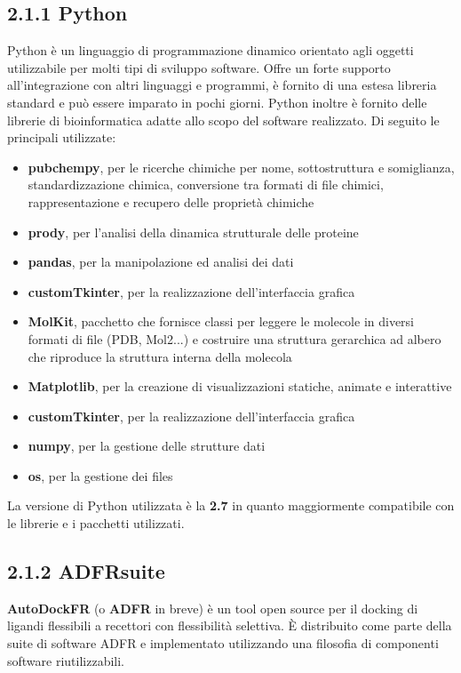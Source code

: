 \subsection*{2.1.1 Python}
\def\baselinestretch{1.66}
\noindent Python è un linguaggio di programmazione dinamico orientato agli oggetti utilizzabile per molti tipi  di sviluppo software. Offre un forte supporto all'integrazione con altri linguaggi e programmi, è fornito di una estesa libreria standard e può essere imparato in pochi giorni. Python inoltre è fornito delle librerie di bioinformatica adatte allo scopo del software realizzato. Di seguito le principali utilizzate:
\begin{itemize}
\item \textbf{pubchempy}, per le ricerche chimiche per nome, sottostruttura e somiglianza, standardizzazione chimica, conversione tra formati di file chimici, rappresentazione e recupero delle proprietà chimiche
\item \textbf{prody}, per l'analisi della dinamica strutturale delle proteine
\item \textbf{pandas}, per la manipolazione ed analisi dei dati
\item \textbf{customTkinter}, per la realizzazione dell'interfaccia grafica
\item \textbf{MolKit}, pacchetto che fornisce classi per leggere le molecole in diversi formati di file (PDB, Mol2...) e costruire una struttura gerarchica ad albero che riproduce la struttura interna della molecola
\item \textbf{Matplotlib}, per la creazione di visualizzazioni statiche, animate e interattive
\item \textbf{customTkinter}, per la realizzazione dell'interfaccia grafica
\item \textbf{numpy}, per la gestione delle strutture dati
\item \textbf{os}, per la gestione dei files
\end{itemize} 
La versione di Python utilizzata è la \textbf{2.7} in quanto maggiormente compatibile con le librerie e i pacchetti utilizzati.

\subsection*{2.1.2 ADFRsuite}
\def\baselinestretch{1.66}
\noindent \textbf{AutoDockFR} (o \textbf{ADFR} in breve) è un tool open source per il docking di ligandi flessibili a recettori con flessibilità selettiva. È distribuito come parte della suite di software ADFR e implementato utilizzando una filosofia di componenti software riutilizzabili.

